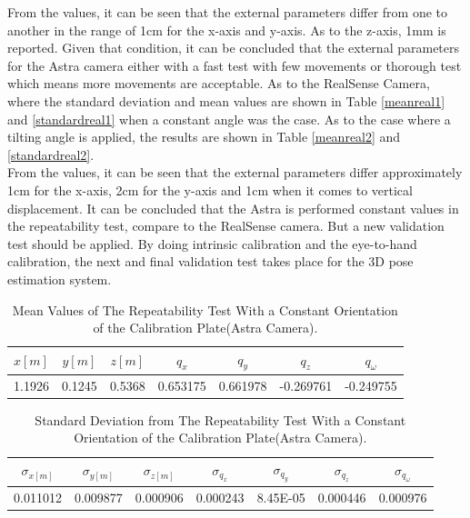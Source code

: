 From the values, it can be seen that the external parameters differ from one to another in the range of 1cm for the x-axis and y-axis. As to the z-axis, 1mm is reported. Given that condition, it can be concluded that the external parameters for the Astra camera either with a fast test with few movements or thorough test which means more movements are acceptable.
As to the RealSense Camera, where the standard deviation and mean values are shown in Table \ref{meanreal1} and \ref{standardreal1} when a constant angle was the case. As to the case where a tilting angle is applied, the results are shown in Table \ref{meanreal2} and \ref{standardreal2}.\\
From the values, it can be seen that the external parameters differ approximately 1cm for the x-axis, 2cm for the y-axis and 1cm  when it comes to vertical displacement.  It can be concluded that the Astra is performed constant values in the repeatability test, compare to the RealSense camera. But a new validation test should be applied. 
By doing intrinsic calibration and the eye-to-hand calibration, the next and final validation test takes place for the 3D pose estimation system.


\begin{table}[b]
\renewcommand{\arraystretch}{1.3}
\caption{Mean Values of The Repeatability Test With a Constant Orientation of the Calibration Plate(Astra Camera).}
\label{meanastra1}
\centering
\begin{tabular}{|c||c||c||c||c||c||c|}
\hline
$x[m]$ & $y[m]$ & $z[m]$ & $q_{x}$ & $q_{y}$ & $q_{z}$ &$q_{\omega}$ \\
\hline
1.1926 & 0.1245 & 0.5368& 0.653175&	0.661978&	-0.269761&	-0.249755 \\
\hline
\hline
\end{tabular}
\end{table}

\begin{table}[b]
\renewcommand{\arraystretch}{1.3}
\caption{Standard Deviation from The Repeatability Test With a Constant Orientation of the Calibration Plate(Astra Camera).}
\label{standardastra1}
\centering
\begin{tabular}{|c||c||c||c||c||c||c|}
\hline
$\sigma_{x[m]}$ & $\sigma_{y[m]}$ & $\sigma_{z[m]}$ & $\sigma_{q_{x}}$ & $\sigma_{q_{y}}$ & $\sigma_{q_{z}}$ &$\sigma_{q_{\omega}}$ \\
\hline
0.011012&	0.009877	&0.000906&0.000243&	8.45E-05&	0.000446&	0.000976\\
\hline
\hline
\end{tabular}
\end{table}



